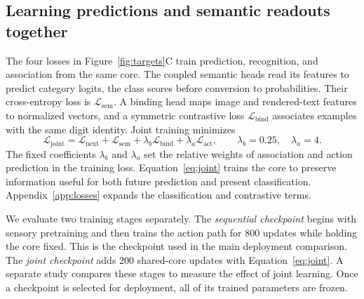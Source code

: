 \subsection{Learning predictions and semantic readouts together}
The four losses in Figure~\ref{fig:targets}C train prediction, recognition,
and association from the same core. The coupled semantic heads read its
features to predict category logits, the class scores before conversion to
probabilities.
Their cross-entropy loss is $\mathcal L_{\mathrm{sem}}$. A binding head maps
image and rendered-text features to normalized vectors, and a symmetric
contrastive loss $\mathcal L_{\mathrm{bind}}$ associates examples with the same
digit identity. Joint training minimizes
\begin{equation}
 \mathcal L_{\mathrm{joint}}=
 \mathcal L_{\mathrm{next}}+\mathcal L_{\mathrm{sem}}
 +\lambda_b\mathcal L_{\mathrm{bind}}+\lambda_a\mathcal L_{\mathrm{act}},
 \qquad \lambda_b=0.25,\quad\lambda_a=4.
 \label{eq:joint}
\end{equation}
The fixed coefficients $\lambda_b$ and $\lambda_a$ set the relative weights
of association and action prediction in the training loss.
Equation~\eqref{eq:joint} trains the core to preserve
information useful for both future prediction and present classification.
Appendix~\ref{app:losses} expands the classification and contrastive terms.

We evaluate two training stages separately.
The \emph{sequential checkpoint} begins with sensory pretraining and then trains
the action path for 800 updates while holding the core fixed. This is the
checkpoint used in the main deployment comparison. The \emph{joint checkpoint}
adds 200 shared-core updates with Equation~\eqref{eq:joint}. A separate study
compares these stages to measure the effect of joint learning. Once a checkpoint
is selected for deployment, all of its trained parameters are frozen.
